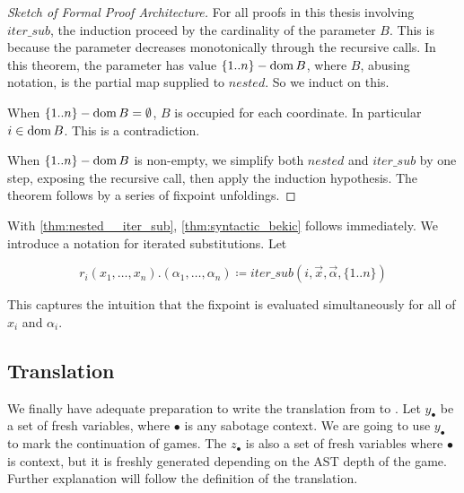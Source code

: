 \begin{proof}[Sketch of Formal Proof Architecture]
For all proofs in this thesis involving $iter\_sub$, the induction proceed by the cardinality of the parameter $B$. This is because the parameter decreases monotonically through the recursive calls. In this theorem, the parameter has value $\{1..n\}-\operatorname{dom} B$, where $B$, abusing notation, is the partial map supplied to $nested$. So we induct on this.

When $\{1..n\} - \operatorname{dom} B = \emptyset$, $B$ is occupied for each coordinate. In particular $i\in \operatorname{dom} B$. This is a contradiction.

When $\{1..n\} - \operatorname{dom} B$ is non-empty, we simplify both $nested$ and $iter\_sub$ by one step, exposing the recursive call, then apply the induction hypothesis. The theorem follows by a series of fixpoint unfoldings.
    
\end{proof}

With \autoref{thm:nested__iter_sub}, \autoref{thm:syntactic_bekic} follows immediately. We introduce a notation for iterated substitutions. Let

\[r_i(x_1,\dots,x_n). (\alpha_1,\dots,\alpha_n) \coloneq iter\_sub (i, \vec{x}, \vec{\alpha}, \{1..n\})\]

This captures the intuition that the fixpoint is evaluated simultaneously for all of $x_i$ and $\alpha_i$.

\subsection{Translation}
We finally have adequate preparation to write the translation from \GLs{} to \rlGL{}. Let $y_\bullet$ be a set of fresh variables, where $\bullet$ is any sabotage context. We are going to use $y_\bullet$ to mark the continuation of games. The $z_\bullet$ is also a set of fresh variables where $\bullet$ is context, but it is freshly generated depending on the AST depth of the game. Further explanation will follow the definition of the translation.

